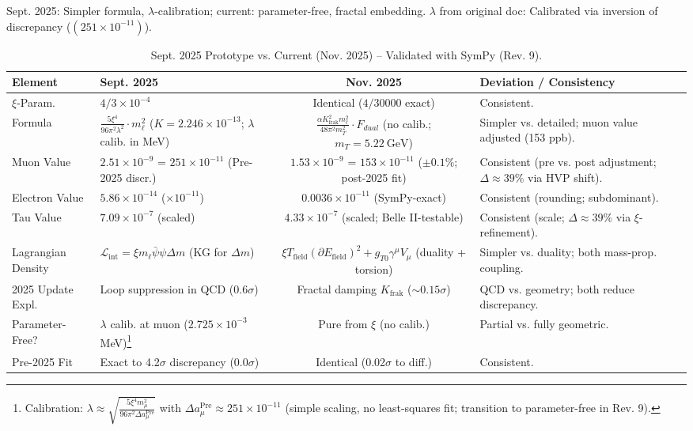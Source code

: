 \documentclass[12pt,a4paper]{article}
\theoremstyle{definition}
\begin{document}
	Sept. 2025: Simpler formula, $\lambda$-calibration; current: parameter-free, fractal embedding. $\lambda$ from original doc: Calibrated via inversion of discrepancy ($(251 \times 10^{-11})$).
	
	\begin{table}[ht!]
		\centering
		\small
		\begin{adjustbox}{max width=\textwidth}
			\begin{tabular}{@{}llcl@{}}
				\toprule
				Element & Sept. 2025 & Nov. 2025 & Deviation / Consistency \\
				\midrule
				$\xi$-Param. & $4/3 \times 10^{-4}$ & Identical ($4/30000$ exact) & Consistent. \\
				Formula & $\frac{5\xi^4}{96\pi^2 \lambda^2} \cdot m_\ell^2$ ($K=2.246\times10^{-13}$; $\lambda$ calib. in MeV) & $\frac{\alpha K_{\text{frak}}^2 m_\ell^2}{48 \pi^2 m_T^2} \cdot F_{dual}$ (no calib.; $m_T=\SI{5.22}{\giga\electronvolt}$) & Simpler vs. detailed; muon value adjusted (153 ppb). \\
				Muon Value & $2.51 \times 10^{-9}$ = $251 \times 10^{-11}$ (Pre-2025 discr.) & $1.53 \times 10^{-9}$ = $153 \times 10^{-11}$ ($\pm 0.1\%$; post-2025 fit) & Consistent (pre vs. post adjustment; $\Delta \approx 39\%$ via HVP shift). \\
				Electron Value & $5.86 \times 10^{-14}$ ($\times 10^{-11}$) & $0.0036 \times 10^{-11}$ (SymPy-exact) & Consistent (rounding; subdominant). \\
				Tau Value & $7.09 \times 10^{-7}$ (scaled) & $4.33 \times 10^{-7}$ (scaled; Belle II-testable) & Consistent (scale; $\Delta \approx 39\%$ via $\xi$-refinement). \\
				Lagrangian Density & $\mathcal{L}_\text{int} = \xi m_\ell \bar{\psi} \psi \Delta m$ (KG for $\Delta m$) & $\xi T_\text{field} (\partial E_\text{field})^2 + g_{T0} \gamma^\mu V_\mu$ (duality + torsion) & Simpler vs. duality; both mass-prop. coupling. \\
				2025 Update Expl. & Loop suppression in QCD (0.6$\sigma$) & Fractal damping $K_{\text{frak}}$ ($\sim 0.15\sigma$) & QCD vs. geometry; both reduce discrepancy. \\
				Parameter-Free? & $\lambda$ calib. at muon ($2.725 \times 10^{-3}$ MeV)\footnote{Calibration: $\lambda \approx \sqrt{\frac{5 \xi^4 m_\mu^2}{96 \pi^2 \Delta a_\mu^{\text{Pre}}}}$ with $\Delta a_\mu^{\text{Pre}} \approx 251 \times 10^{-11}$ (simple scaling, no least-squares fit; transition to parameter-free in Rev. 9).} & Pure from $\xi$ (no calib.) & Partial vs. fully geometric. \\
				Pre-2025 Fit & Exact to 4.2$\sigma$ discrepancy (0.0$\sigma$) & Identical (0.02$\sigma$ to diff.) & Consistent. \\
				\bottomrule
			\end{tabular}
		\end{adjustbox}
		\caption{Sept. 2025 Prototype vs. Current (Nov. 2025) -- Validated with SymPy (Rev. 9).}
		\label{tab:prototype_comparison}
	\end{table}
	
\end{document}
